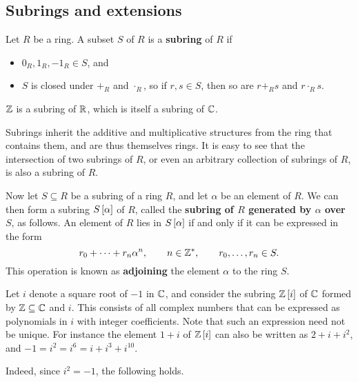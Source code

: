 \subsection{Subrings and extensions}

\begin{definition}
Let $ R $ be a ring. A subset $ S $ of $ R $ is a \textbf{subring} of $ R $ if
\begin{itemize}
\item $ 0_R, 1_R, -1_R \in S $, and
\item $ S $ is closed under $ +_R $ and $ \cdot_R $, so if $ r, s \in S $, then so are $ r +_R s $ and $ r \cdot_R s $.
\end{itemize}
\end{definition}

\begin{example*}
$ \Z $ is a subring of $ \R $, which is itself a subring of $ \C $.
\end{example*}

Subrings inherit the additive and multiplicative structures from the ring that contains them, and are thus themselves rings. It is easy to see that the intersection of two subrings of $ R $, or even an arbitrary collection of subrings of $ R $, is also a subring of $ R $.

\begin{definition}
Now let $ S \subseteq R $ be a subring of a ring $ R $, and let $ \alpha $ be an element of $ R $. We can then form a subring $ S\sb{\alpha} $ of $ R $, called the \textbf{subring of $ R $ generated by $ \alpha $ over $ S $}, as follows. An element of $ R $ lies in $ S\sb{\alpha} $ if and only if it can be expressed in the form
$$ r_0 + \dots + r_n\alpha^n, \qquad n \in \Z^*, \qquad r_0, \dots, r_n \in S. $$
This operation is known as \textbf{adjoining} the element $ \alpha $ to the ring $ S $.
\end{definition}

\begin{example*}
Let $ i $ denote a square root of $ -1 $ in $ \C $, and consider the subring $ \Z\sb{i} $ of $ \C $ formed by $ \Z \subseteq \C $ and $ i $. This consists of all complex numbers that can be expressed as polynomials in $ i $ with integer coefficients. Note that such an expression need not be unique. For instance the element $ 1 + i $ of $ \Z\sb{i} $ can also be written as $ 2 + i + i^2 $, and $ -1 = i^2 = i^6 = i + i^3 + i^{10} $.
\end{example*}

Indeed, since $ i^2 = -1 $, the following holds.

